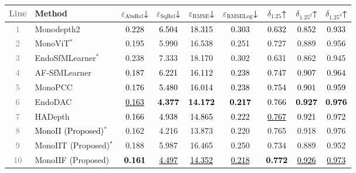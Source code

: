 \documentclass[a4paper,fleqn]{cas-dc}
\begin{document}
{\begin{table}[!hbt]
\centering
\begin{tabular}{clccccccc}
\toprule
\textcolor{gray}{Line} & Method & $\varepsilon_\text{AbsRel}$↓ & 
        $\varepsilon_\text{SqRel}$↓ & 
        $\varepsilon_\text{RMSE}$↓ & 
        $\varepsilon_\text{RMSELog}$↓ & 
        $\delta_{1.25}$↑ & $\delta_{1.25^2}$↑ & 
        $\delta_{1.25^3}$↑ \\
\midrule
\textcolor{gray}{1} &Monodepth2     & \textcolor{black}{0.228} & \textcolor{black}{6.504} & \textcolor{black}{18.315} & \textcolor{black}{0.303} & \textcolor{black}{0.632} & \textcolor{black}{0.852} & \textcolor{black}{0.933} \\
\textcolor{gray}{2} &MonoViT$^{\ast}$ & 0.195 & 5.990 & 16.538 & 0.251 & 0.727 & 0.889 & 0.956 \\
\textcolor{gray}{3} &EndoSfMLearner$^{\ast}$ & 0.238 & 7.333 & 18.170 & 0.302 & 0.631 & 0.862 & 0.945 \\
\textcolor{gray}{4} &AF-SfMLearner  & \textcolor{black}{0.187} & \textcolor{black}{6.221} & \textcolor{black}{16.112} & \textcolor{black}{0.238} & \textcolor{black}{0.747} & \textcolor{black}{0.907} & \textcolor{black}{0.964} \\
\textcolor{gray}{5} &MonoPCC        & \textcolor{black}{0.176} & \textcolor{black}{5.480} & \textcolor{black}{16.014} & \textcolor{black}{0.238} & \textcolor{black}{0.754} & \textcolor{black}{0.901} & \textcolor{black}{0.959} \\
\textcolor{gray}{6} &EndoDAC        & \textcolor{black}{\underline{0.163}} & \textcolor{black}{\textbf{4.377}} & \textcolor{black}{\textbf{14.172}} & \textcolor{black}{\textbf{0.217}} & \textcolor{black}{0.766} & \textcolor{black}{\textbf{0.927}} & \textcolor{black}{\textbf{0.976}} \\
\textcolor{gray}{7} &HADepth        & \textcolor{black}{0.166} & \textcolor{black}{4.938} & \textcolor{black}{14.865} & \textcolor{black}{0.222} & \textcolor{black}{\underline{0.767}} & \textcolor{black}{0.921} & \textcolor{black}{0.972} \\
\midrule
\textcolor{gray}{8} & \textcolor{black}{MonoII (Proposed)}$^{\ast}$ & 0.162 & 4.216 & 13.873 & 0.220 & 0.765 & 0.918 & 0.976 \\
\textcolor{gray}{9} &MonoIIT (Proposed)$^{\ast}$ & 0.188 & 5.987 & 16.465 & 0.250 & 0.734 & 0.889 & 0.952 \\
\textcolor{gray}{10} &MonoIIF (Proposed) & \textcolor{black}{\textbf{0.161}} & \textcolor{black}{\underline{4.497}} & \textcolor{black}{\underline{14.352}} & \textcolor{black}{\underline{0.218}} & \textcolor{black}{\textbf{0.772}} & \textcolor{black}{\underline{0.926}} & \textcolor{black}{\underline{0.973}} \\

\end{tabular}
\end{table}}
\end{document}
